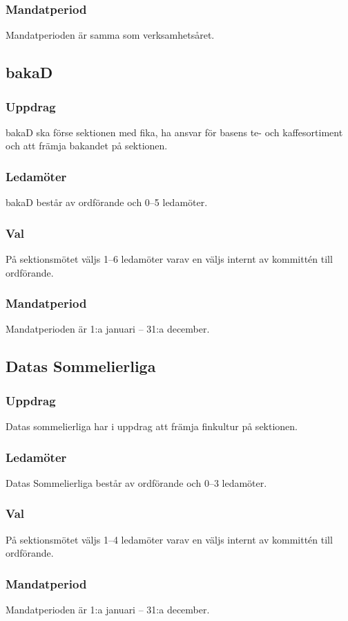 \subsubsection{Mandatperiod}
Mandatperioden är samma som verksamhetsåret. 

\subsection{bakaD}
\subsubsection{Uppdrag}
bakaD ska förse sektionen med fika, ha ansvar för basens te- och kaffesortiment och att främja bakandet på sektionen.
\subsubsection{Ledamöter}
bakaD består av ordförande och 0--5 ledamöter.
\subsubsection{Val}
På sektionsmötet väljs 1--6 ledamöter varav en väljs internt av kommittén till ordförande.
\subsubsection{Mandatperiod}
Mandatperioden är 1:a januari – 31:a december.

\subsection{Datas Sommelierliga}
\subsubsection{Uppdrag}
Datas sommelierliga har i uppdrag att främja finkultur på sektionen.
\subsubsection{Ledamöter}
Datas Sommelierliga består av ordförande och 0--3 ledamöter.
\subsubsection{Val}
På sektionsmötet väljs 1--4 ledamöter varav en väljs internt av kommittén till ordförande.
\subsubsection{Mandatperiod}
Mandatperioden är 1:a januari – 31:a december.
\newpage
